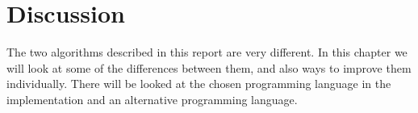 \chapter{Discussion}
\emptyTop{}
The two algorithms described in this report are very different.
In this chapter we will look at some of the differences between them, and also ways to improve them individually. 
There will be looked at the chosen programming language in the implementation and an alternative programming language.






